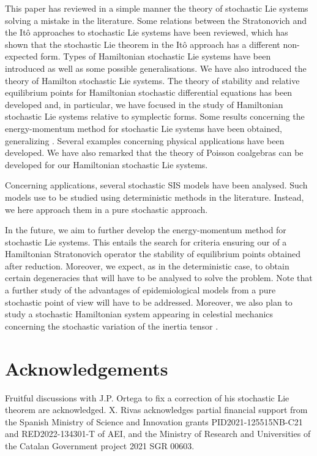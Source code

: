 \documentclass[11pt]{article}
\theoremstyle{plain}
\theoremstyle{definition}
\begin{document}
This paper has reviewed in a simple manner the theory of stochastic Lie systems solving a mistake in the literature. Some relations between the Stratonovich and the It\^o approaches to stochastic Lie systems have been reviewed, which has shown that the stochastic Lie theorem in the It\^o approach has a different non-expected form. Types of Hamiltonian stochastic Lie systems have been introduced as well as some possible generalisations. We have also introduced the theory of Hamilton stochastic Lie systems. The theory of stability and relative equilibrium points for Hamiltonian stochastic differential equations has been developed and, in particular, we have focused in the study of Hamiltonian stochastic Lie systems relative to symplectic forms. Some results concerning the energy-momentum method for stochastic Lie systems have been obtained, generalizing \cite{Bz_14}. Several examples concerning physical applications have been developed. We have also remarked that the theory of Poisson coalgebras can be developed for our Hamiltonian stochastic Lie systems.

Concerning applications, several stochastic SIS models have been analysed. Such models use to be studied using deterministic methods in the literature. Instead, we here approach them in a pure stochastic approach. 

In the future, we aim to further develop the energy-momentum method for stochastic Lie systems. This entails the search for criteria ensuring our of a Hamiltonian Stratonovich operator the stability of equilibrium points obtained after reduction. Moreover, we expect, as in the deterministic case, to obtain certain degeneracies that will have to be analysed to solve the problem.  Note that a further study of the advantages of epidemiological models from a pure stochastic point of view will have to be addressed. Moreover, we also plan to study a stochastic Hamiltonian system appearing in celestial mechanics concerning the stochastic variation of the inertia tensor \cite{Sa70}.



\section*{Acknowledgements}
Fruitful discussions with J.P. Ortega to fix a correction of his stochastic Lie theorem are acknowledged. 
X. Rivas acknowledges partial financial support from the Spanish Ministry of Science and Innovation grants PID2021-125515NB-C21 and RED2022-134301-T of AEI, and the Ministry of Research and Universities of the Catalan Government project 2021 SGR 00603.
\end{document}
